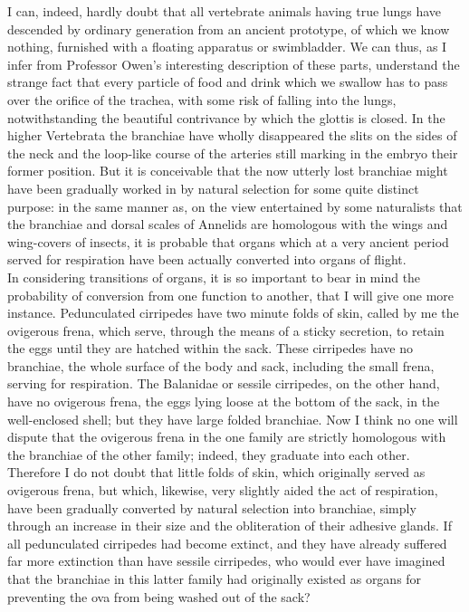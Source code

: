 \indent I can, indeed, hardly doubt that all vertebrate animals having true lungs have descended by ordinary generation from an ancient prototype, of which we know nothing, furnished with a floating apparatus or swimbladder. We can thus, as I infer from Professor Owen's interesting description of these parts, understand the strange fact that every particle of food and drink which we swallow has to pass over the orifice of the trachea, with some risk of falling into the lungs, notwithstanding the beautiful contrivance by which the glottis is closed. In the higher Vertebrata the branchiae have wholly disappeared the slits on the sides of the neck and the loop-like course of the arteries still marking in the embryo their former position. But it is conceivable that the now utterly lost branchiae might have been gradually worked in by natural selection for some quite distinct purpose: in the same manner as, on the view entertained by some naturalists that the branchiae and dorsal scales of Annelids are homologous with the wings and wing-covers of insects, it is probable that organs which at a very ancient period served for respiration have been actually converted into organs of flight.\\
\indent In considering transitions of organs, it is so important to bear in mind the probability of conversion from one function to another, that I will give one more instance. Pedunculated cirripedes have two minute folds of skin, called by me the ovigerous frena, which serve, through the means of a sticky secretion, to retain the eggs until they are hatched within the sack. These cirripedes have no branchiae, the whole surface of the body and sack, including the small frena, serving for respiration. The Balanidae or sessile cirripedes, on the other hand, have no ovigerous frena, the eggs lying loose at the bottom of the sack, in the well-enclosed shell; but they have large folded branchiae. Now I think no one will dispute that the ovigerous frena in the one family are strictly homologous with the branchiae of the other family; indeed, they graduate into each other. Therefore I do not doubt that little folds of skin, which originally served as ovigerous frena, but which, likewise, very slightly aided the act of respiration, have been gradually converted by natural selection into branchiae, simply through an increase in their size and the obliteration of their adhesive glands. If all pedunculated cirripedes had become extinct, and they have already suffered far more extinction than have sessile cirripedes, who would ever have imagined that the branchiae in this latter family had originally existed as organs for preventing the ova from being washed out of the sack?\\
